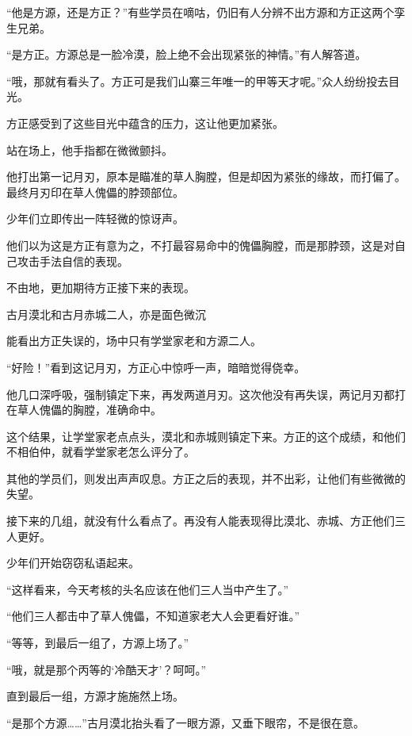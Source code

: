 
\begin{this_body}



“他是方源，还是方正？”有些学员在嘀咕，仍旧有人分辨不出方源和方正这两个孪生兄弟。

“是方正。方源总是一脸冷漠，脸上绝不会出现紧张的神情。”有人解答道。

“哦，那就有看头了。方正可是我们山寨三年唯一的甲等天才呢。”众人纷纷投去目光。

方正感受到了这些目光中蕴含的压力，这让他更加紧张。

站在场上，他手指都在微微颤抖。

他打出第一记月刃，原本是瞄准的草人胸膛，但是却因为紧张的缘故，而打偏了。最终月刃印在草人傀儡的脖颈部位。

少年们立即传出一阵轻微的惊讶声。

他们以为这是方正有意为之，不打最容易命中的傀儡胸膛，而是那脖颈，这是对自己攻击手法自信的表现。

不由地，更加期待方正接下来的表现。

古月漠北和古月赤城二人，亦是面色微沉

能看出方正失误的，场中只有学堂家老和方源二人。

“好险！”看到这记月刃，方正心中惊呼一声，暗暗觉得侥幸。

他几口深呼吸，强制镇定下来，再发两道月刃。这次他没有再失误，两记月刃都打在草人傀儡的胸膛，准确命中。

这个结果，让学堂家老点点头，漠北和赤城则镇定下来。方正的这个成绩，和他们不相伯仲，就看学堂家老怎么评分了。

其他的学员们，则发出声声叹息。方正之后的表现，并不出彩，让他们有些微微的失望。

接下来的几组，就没有什么看点了。再没有人能表现得比漠北、赤城、方正他们三人更好。

少年们开始窃窃私语起来。

“这样看来，今天考核的头名应该在他们三人当中产生了。”

“他们三人都击中了草人傀儡，不知道家老大人会更看好谁。”

“等等，到最后一组了，方源上场了。”

“哦，就是那个丙等的‘冷酷天才’？呵呵。”

直到最后一组，方源才施施然上场。

“是那个方源……”古月漠北抬头看了一眼方源，又垂下眼帘，不是很在意。


\end{this_body}
